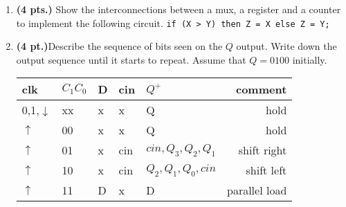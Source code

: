 \documentclass{article}
\begin{document}
\begin{enumerate}
\item {\bf (4 pts.)} Show the interconnections between a mux, a 
register and a counter to implement the following circuit.
\verb+if (X > Y) then Z = X else Z = Y;+


\pagebreak
\item {\bf (4 pt.)}Describe the sequence of bits seen on the
$Q$ output.  Write down the output sequence until it starts to 
repeat.  Assume that $Q=0100$ initially.

\begin{tabular}{l|l|l|l||l|r}
clk         & $C_1 C_0$ & D & cin & $Q^+$ & comment \\ \hline \hline
0,1,$\downarrow$ & xx   & x & x   & Q     & hold     \\ \hline
$\uparrow$     & 00     & x & x   & Q     & hold     \\  \hline
$\uparrow$     & 01     & x & cin & $cin,Q_3,Q_2,Q_1$  & shift right \\  \hline
$\uparrow$     & 10     & x & cin & $Q_2,Q_1,Q_0,cin$  & shift left \\  \hline
$\uparrow$     & 11     & D & x   & D     & parallel load  \\ 
\end{tabular}


\end{enumerate}
\end{document}
